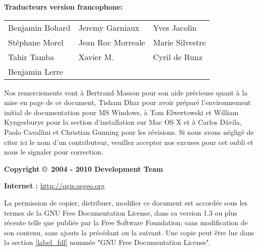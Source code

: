 \begin{flushleft}
\textbf{Traducteurs version francophone:}
  \par\bigskip\noindent
\begin{tabular}{p{4cm} p{4cm} p{4cm}}
Benjamin Bohard & Jeremy Garniaux & Yves Jacolin \\
Stéphane Morel & Jean Roc Morreale & Marie Silvestre \\
Tahir Tamba & Xavier M. & Cyril de Runz \\
Benjamin Lerre \\
\end{tabular}
\end{flushleft}

Nos remerciements vont à Bertrand Masson pour son aide précieuse quant à la mise en page de ce document, Tisham Dhar pour avoir préparé l'environnement initial de documentation pour MS Windows, à Tom Elwertowski et William Kyngesburye pour la section d'installation sur Mac OS X et à Carlos  D\'{a}vila, Paolo Cavallini et Christian Gunning pour les révisions. Si nous avons négligé de citer ici le nom d'un contributeur, veuillez accepter nos excuses pour cet oubli et nous le signaler pour correction.
\par\bigskip\noindent
\textbf{Copyright \copyright~2004 - 2010 \QG Development Team}
\par\bigskip\noindent
\textbf{Internet :} \url{http://qgis.osgeo.org}

\newpage


La permission de copier, distribuer, modifier ce document est accordée sous les termes de la GNU Free Documentation License, dans sa version 1.3 ou plus récente telle que publiée par la Free Software Foundation; sans modification de son contenu, sans ajouts la précédant ou la suivant. Une copie peut être lue dans la section \ref{label_fdl} nommée "GNU Free Documentation License".
